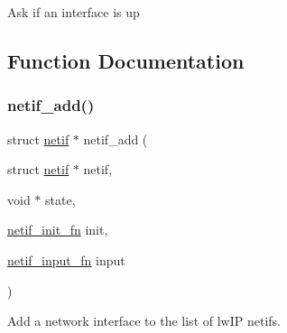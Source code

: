 Ask if an interface is up 

\subsection{Function Documentation}
\mbox{\label{group__netif_gabde72af134ae7047a46ad7719d2a1ee9}} 
\subsubsection{\texorpdfstring{netif\+\_\+add()}{netif\_add()}}
{\footnotesize\ttfamily struct \hyperlink{structnetif}{netif} $\ast$ netif\+\_\+add (\begin{DoxyParamCaption}\item[{struct \hyperlink{structnetif}{netif} $\ast$}]{netif,  }\item[{void $\ast$}]{state,  }\item[{\hyperlink{openmote-cc2538_2lwip_2src_2include_2lwip_2netif_8h_a2b02a78a8769925ff8e4f83d34e5e1f5}{netif\+\_\+init\+\_\+fn}}]{init,  }\item[{\hyperlink{openmote-cc2538_2lwip_2src_2include_2lwip_2netif_8h_ab2302b1b64ac7b95f24c6bab754a575e}{netif\+\_\+input\+\_\+fn}}]{input }\end{DoxyParamCaption})}

Add a network interface to the list of lw\+IP netifs.


